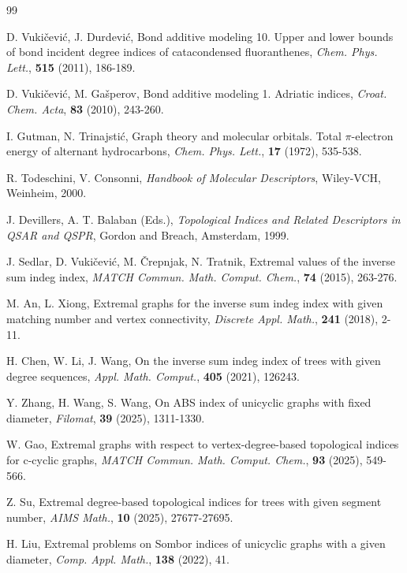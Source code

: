 \documentclass[12pt]{article}
\theoremstyle{definition}
\begin{document}
\begin{thebibliography}{99}

D. Vukičević, J. Durdević, Bond additive modeling 10. Upper and lower bounds of bond incident degree indices of catacondensed fluoranthenes, \textit{Chem. Phys. Lett.}, \textbf{515} (2011), 186-189.

D. Vukičević, M. Gašperov, Bond additive modeling 1. Adriatic indices, \textit{Croat. Chem. Acta}, \textbf{83} (2010), 243-260.

I. Gutman, N. Trinajstić, Graph theory and molecular orbitals. Total $\pi$-electron energy of alternant hydrocarbons, \textit{Chem. Phys. Lett.}, \textbf{17} (1972), 535-538.

R. Todeschini, V. Consonni, \textit{Handbook of Molecular Descriptors}, Wiley-VCH, Weinheim, 2000.

J. Devillers, A. T. Balaban (Eds.), \textit{Topological Indices and Related Descriptors in QSAR and QSPR}, Gordon and Breach, Amsterdam, 1999.

J. Sedlar, D. Vukičević, M. Črepnjak, N. Tratnik, Extremal values of the inverse sum indeg index, \textit{MATCH Commun. Math. Comput. Chem.}, \textbf{74} (2015), 263-276.

M. An, L. Xiong, Extremal graphs for the inverse sum indeg index with given matching number and vertex connectivity, \textit{Discrete Appl. Math.}, \textbf{241} (2018), 2-11.

H. Chen, W. Li, J. Wang, On the inverse sum indeg index of trees with given degree sequences, \textit{Appl. Math. Comput.}, \textbf{405} (2021), 126243.

Y. Zhang, H. Wang, S. Wang, On ABS index of unicyclic graphs with fixed diameter, \textit{Filomat}, \textbf{39} (2025), 1311-1330.

W. Gao, Extremal graphs with respect to vertex-degree-based topological indices for c-cyclic graphs, \textit{MATCH Commun. Math. Comput. Chem.}, \textbf{93} (2025), 549-566.

Z. Su, Extremal degree-based topological indices for trees with given segment number, \textit{AIMS Math.}, \textbf{10} (2025), 27677-27695.

H. Liu, Extremal problems on Sombor indices of unicyclic graphs with a given diameter, \textit{Comp. Appl. Math.}, \textbf{138} (2022), 41.


\end{thebibliography}
\end{document}
